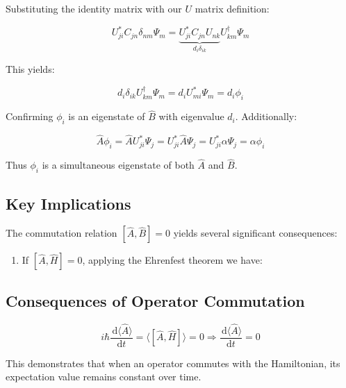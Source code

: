 \documentclass[italian]{HKNdocument}
\begin{document}
Substituting the identity matrix with our $U$ matrix definition:

\begin{equation}
U_{j i}^{*} C_{j n} \delta_{n m} \Psi_{m}=\underbrace{U_{j i}^{*} C_{j n} U_{n k}}_{d_{i} \delta_{i k}} U_{k m}^{\dagger} \Psi_{m}
\end{equation}

This yields:

\begin{equation}
d_{i} \delta_{i k} U_{k m}^{\dagger} \Psi_{m}=d_{i} U_{m i}^{*} \Psi_{m}=d_{i} \phi_{i}
\end{equation}

Confirming $\phi_{i}$ is an eigenstate of $\hat{B}$ with eigenvalue $d_i$. Additionally:

\begin{equation}
\hat{A} \phi_{i}=\hat{A} U_{j i}^{*} \Psi_{j}=U_{j i}^{*} \hat{A} \Psi_{j}=U_{j i}^{*} \alpha \Psi_{j}=\alpha \phi_{i}
\end{equation}

Thus $\phi_{i}$ is a simultaneous eigenstate of both $\hat{A}$ and $\hat{B}$.

\subsection{Key Implications}
The commutation relation $[\hat{A}, \hat{B}]=0$ yields several significant consequences:

\begin{enumerate}
  \item If $[\hat{A}, \hat{H}]=0$, applying the Ehrenfest theorem we have:
\end{enumerate}


\subsection{Consequences of Operator Commutation}

\begin{equation}
i \hbar \frac{\, \mathrm{d}\langle\hat{A}\rangle}{\mathrm{d} t}=\langle[\hat{A}, \hat{H}]\rangle=0 \Longrightarrow \frac{\, \mathrm{d}\langle\hat{A}\rangle}{\mathrm{d} t}=0
\end{equation}

This demonstrates that when an operator commutes with the Hamiltonian, its expectation value remains constant over time.
\end{document}
